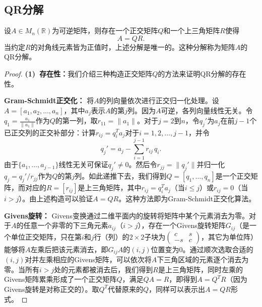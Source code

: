\subsection{QR分解}
\begin{theorem}
	设$A\in M_{n}(\mathbb{R})$为可逆矩阵，则存在一个正交矩阵$Q$和一个上三角矩阵$R$使得 
	\[ A = Q R. \] 
	当约定$R$的对角线元素皆为正值时，上述分解是唯一的。这种分解称为矩阵$A$的QR分解。
\end{theorem}
\begin{proof}
	\textbf{(1)~存在性：}我们介绍三种构造正交矩阵$Q$的方法来证明QR分解的存在性。\par
	\textbf{Gram-Schmidt正交化：} 将$A$的列向量依次进行正交归一化处理。设$A=[a_1, a_2, \dots, a_n]$，其中$a_j$表示$A$的第$j$列。因为$A$可逆，各列向量线性无关。令$q_1=\frac{a_1}{\|a_1\|}$作为$Q$的第一列，取$r_{11}=\|a_1\|$。对于$j=2$到$n$，令$q_j'$为$a_j$在前$j-1$个已正交列的正交补部分：计算$r_{ij}=q_i^T a_j$对于$i=1,2,\dots,j-1$，并令 
	\[ q_j' = a_j - \sum_{i=1}^{j-1} r_{ij}\,q_i. \] 
	由于$\{a_1,\dots,a_{j-1}\}$线性无关可保证$q_j'\neq 0$。然后令$r_{jj}=\|q_j'\|$并归一化$q_j = q_j'/r_{jj}$作为$Q$的第$j$列。如此递推下去，我们得到$Q=[q_1,\dots,q_n]$是一个正交矩阵，而对应的$R=[r_{ij}]$是上三角矩阵，其中$r_{ij}=q_i^T a_j$（当$i\le j$）或$r_{ij}=0$（当$i>j$）。由上述构造可以验证$A=QR$。这种方法即为Gram-Schmidt正交化算法。\par
	\textbf{Givens旋转：} Givens变换通过二维平面内的旋转将矩阵中某个元素消去为零。对于$A$的任意一个非零的下三角元素$a_{ij}$（$i>j$），存在一个Givens旋转矩阵$G_{ij}$（是一个单位正交矩阵，只在第$i$和$j$行（列）的$2\times 2$子块为$\begin{pmatrix}c & s\\ -s & c\end{pmatrix}$，其它为单位阵）能够将$A$左乘后把该元素消去，即$G_{ij} A$的$(i,j)$位置变为$0$。通过顺次选取合适的$(i,j)$对并左乘相应的Givens矩阵，可以依次将$A$下三角区域的元素逐个消去为零。当所有$i>j$处的元素都被消去后，我们得到$R$是上三角矩阵，同时左乘的Givens矩阵累乘形成了一个正交矩阵$Q$，满足$Q A = R$，即得到$A=Q^T R$（因为Givens旋转是对称正交的）。取$Q^T$代替原来的$Q$，同样可以表示出$A=Q R$形式。\par 

\end{proof}
